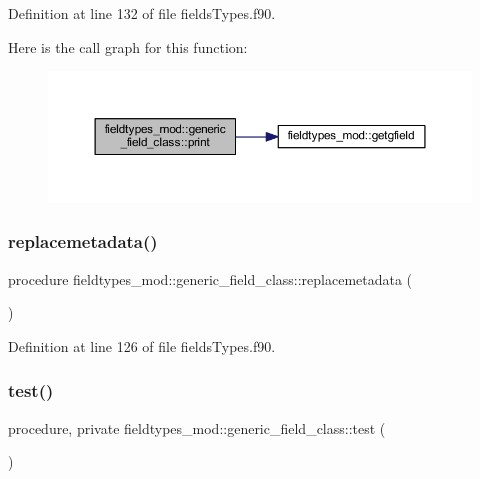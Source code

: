 Definition at line 132 of file fields\+Types.\+f90.

Here is the call graph for this function\+:\nopagebreak
\begin{figure}[H]
\begin{center}
\leavevmode
\includegraphics[width=350pt]{structfieldtypes__mod_1_1generic__field__class_a436070152766aaf4f47e56a1dba98611_cgraph}
\end{center}
\end{figure}
\mbox{\label{structfieldtypes__mod_1_1generic__field__class_a040a6a67e64938b6ce249dd6a584584f}} 
\subsubsection{\texorpdfstring{replacemetadata()}{replacemetadata()}}
{\footnotesize\ttfamily procedure fieldtypes\+\_\+mod\+::generic\+\_\+field\+\_\+class\+::replacemetadata (\begin{DoxyParamCaption}{ }\end{DoxyParamCaption})\hspace{0.3cm}{\ttfamily [private]}}



Definition at line 126 of file fields\+Types.\+f90.

\mbox{\label{structfieldtypes__mod_1_1generic__field__class_a884e1d0b4152f873edc421ee4079aafb}} 
\subsubsection{\texorpdfstring{test()}{test()}}
{\footnotesize\ttfamily procedure, private fieldtypes\+\_\+mod\+::generic\+\_\+field\+\_\+class\+::test (\begin{DoxyParamCaption}{ }\end{DoxyParamCaption})\hspace{0.3cm}{\ttfamily [private]}}



